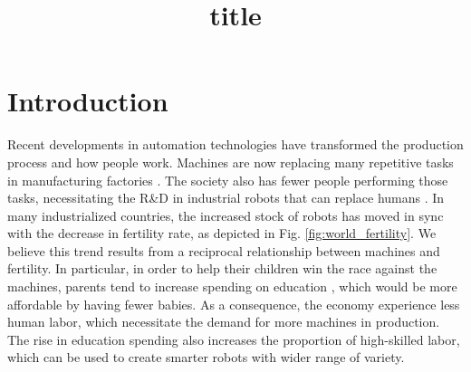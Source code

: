 \documentclass[sn-chicago]{sn-jnl}%
\theoremstyle{thmstyleone}%
\theoremstyle{thmstyletwo}%
\theoremstyle{thmstylethree}%
\begin{document}
	
	\title[Article Title]{title}
	
	
	
	
	\author*[1]{ } 
	
	
	
	
	
	
	
	
	
	
	\maketitle
	
	\section{Introduction}
	
	Recent developments in automation technologies have transformed the production process and how people work. Machines are now replacing many repetitive tasks in manufacturing factories  \citep{schwab2017fourth}. The society also has fewer people performing those tasks, necessitating the R\&D in industrial robots that can replace humans \citep{acemoglu_demographics_2022}. In many industrialized countries, the increased stock of robots has moved in sync with the decrease in fertility rate, as depicted in Fig. \ref{fig:world_fertility}. We believe this trend results from a reciprocal relationship between machines and fertility. In particular, in order to help their children win the race against the machines, parents tend to increase spending on education , which would be more affordable by having fewer babies. As a consequence, the economy experience less human labor, which necessitate the demand for more machines in production. The rise in education spending also increases the proportion of high-skilled labor, which can be used to create smarter robots with wider range of variety. 
	
\end{document}
